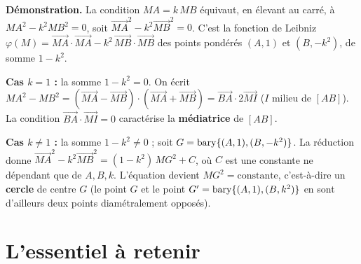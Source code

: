 \begin{remarque}
\textbf{Démonstration.} La condition $MA=k\,MB$ équivaut, en élevant au carré, à
$MA^2-k^2MB^2=0$, soit $\vec{MA}^2-k^2\vec{MB}^2=0$. C'est la fonction de Leibniz
$\varphi(M)=\vec{MA}\cdot\vec{MA}-k^2\,\vec{MB}\cdot\vec{MB}$ des points pondérés
$(A,1)$ et $(B,-k^2)$, de somme $1-k^2$.

\smallskip
\textbf{Cas $k=1$ :} la somme $1-k^2=0$. On écrit
$MA^2-MB^2=(\vec{MA}-\vec{MB})\cdot(\vec{MA}+\vec{MB})=\vec{BA}\cdot 2\vec{MI}$ ($I$
milieu de $[AB]$). La condition $\vec{BA}\cdot\vec{MI}=0$ caractérise la
\textbf{médiatrice} de $[AB]$.

\smallskip
\textbf{Cas $k\neq1$ :} la somme $1-k^2\neq0$ ; soit $G=\operatorname{bary}\{(A,1),(B,-k^2)\}$. La
réduction donne $\vec{MA}^2-k^2\vec{MB}^2=(1-k^2)\,MG^2+C$, où $C$ est une constante ne
dépendant que de $A,B,k$. L'équation devient $MG^2=\text{constante}$, c'est-à-dire un
\textbf{cercle} de centre $G$ (le point $G$ et le point $G'=\operatorname{bary}\{(A,1),(B,k^2)\}$ en
sont d'ailleurs deux points diamétralement opposés).
\end{remarque}

\begin{illus}
\end{illus}

\section{L'essentiel à retenir}

